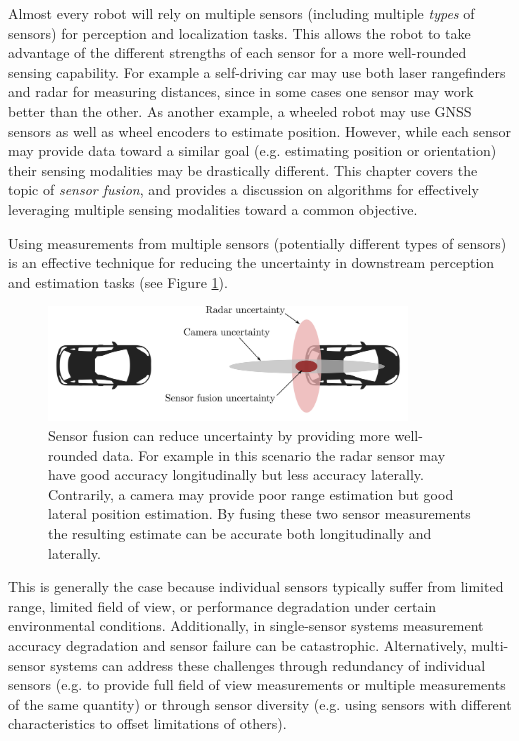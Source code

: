 Almost every robot will rely on multiple sensors (including multiple \textit{types} of sensors) for perception and localization tasks. This allows the robot to take advantage of the different strengths of each sensor for a more well-rounded sensing capability. For example a self-driving car may use both laser rangefinders and radar for measuring distances, since in some cases one sensor may work better than the other. As another example, a wheeled robot may use GNSS sensors as well as wheel encoders to estimate position.
However, while each sensor may provide data toward a similar goal (e.g. estimating position or orientation) their sensing modalities may be drastically different. This chapter covers the topic of \textit{sensor fusion}\cite{Gustafsson2010}\cite{Simon2006}, and provides a discussion on algorithms for effectively leveraging multiple sensing modalities toward a common objective.

Using measurements from multiple sensors (potentially different types of sensors) is an effective technique for reducing the uncertainty in downstream perception and estimation tasks (see Figure \ref{fig:reduceuncertainty}).
\begin{figure}[ht]
    \centering
    \includegraphics[width=0.85\textwidth]{tex/figs/ch18_figs/carsensors.png}
    \caption{Sensor fusion can reduce uncertainty by providing more well-rounded data. For example in this scenario the radar sensor may have good accuracy longitudinally but less accuracy laterally. Contrarily, a camera may provide poor range estimation but good lateral position estimation. By fusing these two sensor measurements the resulting estimate can be accurate both longitudinally and laterally.}
    \label{fig:reduceuncertainty}
\end{figure}
This is generally the case because individual sensors typically suffer from limited range, limited field of view, or performance degradation under certain environmental conditions. Additionally, in single-sensor systems measurement accuracy degradation and sensor failure can be catastrophic. Alternatively, multi-sensor systems can address these challenges through redundancy of individual sensors (e.g. to provide full field of view measurements or multiple measurements of the same quantity) or through sensor diversity (e.g. using sensors with different characteristics to offset limitations of others).


